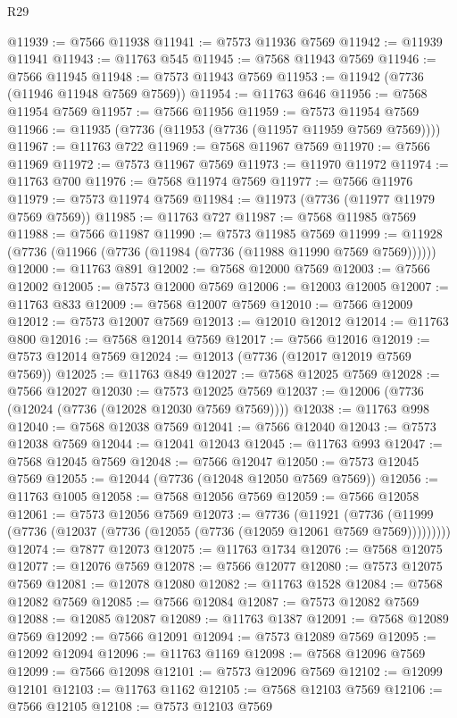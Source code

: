 \begin{lexlean}{R29}
\begin{coremodule}
@11939 := @7566 @11938
@11941 := @7573 @11936 @7569
@11942 := @11939 @11941
@11943 := @11763 @545
@11945 := @7568 @11943 @7569
@11946 := @7566 @11945
@11948 := @7573 @11943 @7569
@11953 := @11942 (@7736 (@11946 @11948 @7569 @7569))
@11954 := @11763 @646
@11956 := @7568 @11954 @7569
@11957 := @7566 @11956
@11959 := @7573 @11954 @7569
@11966 := @11935 (@7736 (@11953 (@7736 (@11957 @11959 @7569 @7569))))
@11967 := @11763 @722
@11969 := @7568 @11967 @7569
@11970 := @7566 @11969
@11972 := @7573 @11967 @7569
@11973 := @11970 @11972
@11974 := @11763 @700
@11976 := @7568 @11974 @7569
@11977 := @7566 @11976
@11979 := @7573 @11974 @7569
@11984 := @11973 (@7736 (@11977 @11979 @7569 @7569))
@11985 := @11763 @727
@11987 := @7568 @11985 @7569
@11988 := @7566 @11987
@11990 := @7573 @11985 @7569
@11999 := @11928 (@7736 (@11966 (@7736 (@11984 (@7736 (@11988 @11990 @7569 @7569))))))
@12000 := @11763 @891
@12002 := @7568 @12000 @7569
@12003 := @7566 @12002
@12005 := @7573 @12000 @7569
@12006 := @12003 @12005
@12007 := @11763 @833
@12009 := @7568 @12007 @7569
@12010 := @7566 @12009
@12012 := @7573 @12007 @7569
@12013 := @12010 @12012
@12014 := @11763 @800
@12016 := @7568 @12014 @7569
@12017 := @7566 @12016
@12019 := @7573 @12014 @7569
@12024 := @12013 (@7736 (@12017 @12019 @7569 @7569))
@12025 := @11763 @849
@12027 := @7568 @12025 @7569
@12028 := @7566 @12027
@12030 := @7573 @12025 @7569
@12037 := @12006 (@7736 (@12024 (@7736 (@12028 @12030 @7569 @7569))))
@12038 := @11763 @998
@12040 := @7568 @12038 @7569
@12041 := @7566 @12040
@12043 := @7573 @12038 @7569
@12044 := @12041 @12043
@12045 := @11763 @993
@12047 := @7568 @12045 @7569
@12048 := @7566 @12047
@12050 := @7573 @12045 @7569
@12055 := @12044 (@7736 (@12048 @12050 @7569 @7569))
@12056 := @11763 @1005
@12058 := @7568 @12056 @7569
@12059 := @7566 @12058
@12061 := @7573 @12056 @7569
@12073 := @7736
    (@11921 (@7736 (@11999 (@7736 (@12037 (@7736 (@12055 (@7736 (@12059 @12061 @7569 @7569)))))))))
@12074 := @7877 @12073
@12075 := @11763 @1734
@12076 := @7568 @12075
@12077 := @12076 @7569
@12078 := @7566 @12077
@12080 := @7573 @12075 @7569
@12081 := @12078 @12080
@12082 := @11763 @1528
@12084 := @7568 @12082 @7569
@12085 := @7566 @12084
@12087 := @7573 @12082 @7569
@12088 := @12085 @12087
@12089 := @11763 @1387
@12091 := @7568 @12089 @7569
@12092 := @7566 @12091
@12094 := @7573 @12089 @7569
@12095 := @12092 @12094
@12096 := @11763 @1169
@12098 := @7568 @12096 @7569
@12099 := @7566 @12098
@12101 := @7573 @12096 @7569
@12102 := @12099 @12101
@12103 := @11763 @1162
@12105 := @7568 @12103 @7569
@12106 := @7566 @12105
@12108 := @7573 @12103 @7569

\end{coremodule}
\end{lexlean}
